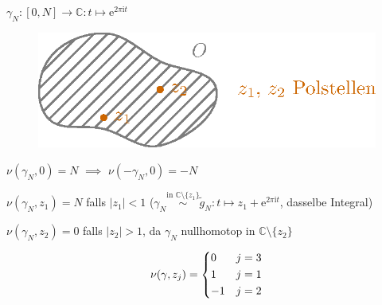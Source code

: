 \documentclass[a4paper,10pt]{scrbook}
\begin{document}
\begin{example}
  \begin{enum-arab}
    \item $\gamma_N : [0,N] \to \mathbb{C} : t \mapsto \mathrm{e}^{2 \pi \mathrm{i} t}$
    \begin{figure}[H]
      \centering
      \includegraphics[scale=0.2]{images/ana3-tmp-33}
    \end{figure}
    $\nu(\gamma_N,0) = N$ $\implies$ $\nu(-\gamma_N,0) = -N$

    $\nu(\gamma_N,z_1) = N$ falls $|z_1| < 1$ ($\gamma_N \overset{\text{in } \mathbb{C}\setminus\{z_1\}}{\sim} \widetilde{g}_N : t \mapsto z_1 + \mathrm{e}^{2 \pi \mathrm{i} t}$, dasselbe Integral)

    $\nu(\gamma_N,z_2) = 0$ falls $|z_2| > 1$, da $\gamma_N$ nullhomotop in $\mathbb{C} \setminus \{z_2\}$

    \item
    \begin{figure}[H]
      \centering
    \end{figure}
    \begin{align*}
      \nu(\gamma,z_j) =
      \begin{dcases}
        0 & j = 3 \\
        1 & j = 1 \\
        -1 & j = 2 \\
      \end{dcases}
    \end{align*}
  \end{enum-arab}
\end{example}
\end{document}
